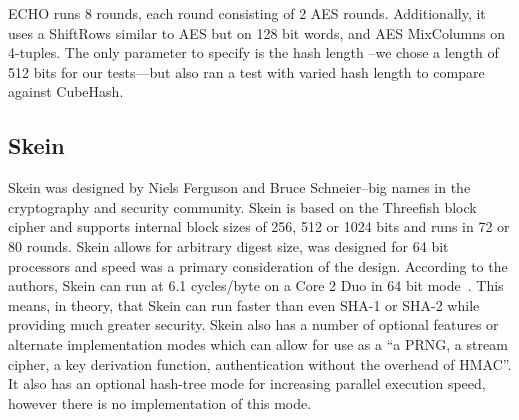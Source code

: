 ECHO runs 8 rounds, each round consisting of 2 AES rounds.
Additionally, it uses a ShiftRows similar to AES but on 128 bit words, and AES MixColumns on 4-tuples.
The only parameter to specify is the hash length --we chose a length of 512 bits for our tests---but also ran a test with varied hash length to compare against CubeHash.

\subsection*{Skein}

Skein was designed by Niels Ferguson and Bruce Schneier--big names in the cryptography and security community.
Skein is based on the Threefish block cipher and supports internal block sizes of 256, 512 or 1024 bits and runs in 72 or 80 rounds.
Skein allows for arbitrary digest size, was designed for 64 bit processors and speed was a primary consideration of the design.
According to the authors, Skein can run at 6.1 cycles/byte on a Core 2 Duo in 64 bit mode~\cite{SkeinSpeed}.
This means, in theory, that Skein can run faster than even SHA-1 or SHA-2 while providing much greater security.
Skein also has a number of optional features or alternate implementation modes which can allow for use as a ``a PRNG, a stream cipher, a key derivation function, authentication without the overhead of HMAC''\cite{SkeinSpeed}.
It also has an optional hash-tree mode for increasing parallel execution speed, however there is no implementation of this mode. 

